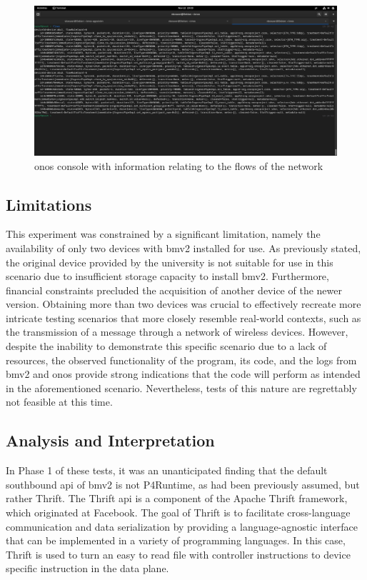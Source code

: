 \begin{figure}
	\centering
	\includegraphics[width=\textwidth]{Chapters/Figures/tests/bmv2_phase_2/onos_flows.PNG}
	\caption{\gls{onos} console with information relating to the flows of the network}
	\label{fig:exp2_phase2_onos_flows}
\end{figure}

\subsection{Limitations}
This experiment was constrained by a significant limitation, namely the availability of only two devices with \gls{bmv2} installed for use. As previously stated, the original device provided by the university is not suitable for use in this scenario due to insufficient storage capacity to install \gls{bmv2}. Furthermore, financial constraints precluded the acquisition of another device of the newer version.
Obtaining more than two devices was crucial to effectively recreate more intricate testing scenarios that more closely resemble real-world contexts, such as the transmission of a message through a network of wireless devices. However, despite the inability to demonstrate this specific scenario due to a lack of resources, the observed functionality of the program, its code, and the logs from \gls{bmv2} and \gls{onos} provide strong indications that the code will perform as intended in the aforementioned scenario. Nevertheless, tests of this nature are regrettably not feasible at this time.

\subsection{Analysis and Interpretation}
In Phase 1 of these tests, it was an unanticipated finding that the default southbound \gls{api} of \gls{bmv2} is not P4Runtime, as had been previously assumed, but rather Thrift. The Thrift \gls{api}\cite{noauthor_apache_nodate} is a component of the Apache Thrift framework, which originated at Facebook. The goal of Thrift is to facilitate cross-language communication and data serialization by providing a language-agnostic interface that can be implemented in a variety of programming languages. In this case, Thrift is used to turn an easy to read file with controller instructions to device specific instruction in the data plane.

